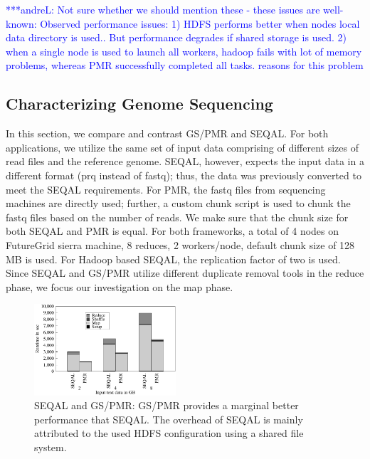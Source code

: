 \documentclass{acm_proc_article-sp}
\newcommand{\alnote}[1]{ {\textcolor{blue} { ***andreL: #1 }}}
\newcommand{\alnote}[1]{}
\begin{document}
\alnote{Not sure whether we should mention these - these issues are well-known: Observed performance issues:
1) HDFS performs better when nodes local data directory is used.. But performance degrades if shared storage is used. 			
2) when a single node is used to launch all workers, hadoop fails with lot of memory problems, whereas PMR successfully completed all tasks.			
reasons for this problem}


\subsection{Characterizing Genome Sequencing}

In this section, we compare and contrast GS/PMR and SEQAL. For both
applications, we utilize the same set of input data comprising of different
sizes of read files and the reference genome. SEQAL, however, expects the input
data in a different format (prq instead of fastq); thus, the data was previously
converted to meet the SEQAL requirements. For PMR, the fastq files from
sequencing machines are directly used; further, a custom chunk script is used to
chunk the fastq files based on the number of reads. We make sure that the chunk
size for both SEQAL and PMR is equal. For both frameworks, a total of 4 nodes on
FutureGrid sierra machine, 8 reduces, 2 workers/node, default chunk size of
128\,MB is used. For Hadoop based SEQAL, the replication factor of two is used.
Since SEQAL and GS/PMR utilize different duplicate removal tools in the reduce
phase, we focus our investigation on the map phase.


\begin{figure}[ht]
	\centering
		\includegraphics[width=0.47\textwidth]{figures/gs_seq_pmr.pdf}
\caption{SEQAL and GS/PMR: GS/PMR provides a marginal better performance that 
SEQAL. The overhead of SEQAL is mainly attributed to the used HDFS configuration 
using a shared file system.} 	
\label{fig:gs_seq_pmr}
\end{figure}		
\end{document}
